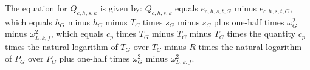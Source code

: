 The equation for \( Q_{c,h,s,k} \) is given by:
\( Q_{c,h,s,k} \) equals \( e_{c,h,s,t,G} \) minus \( e_{c,h,s,t,C} \),
which equals \( h_G \) minus \( h_C \) minus \( T_C \) times \( s_G \) minus \( s_C \) plus one-half times \( \omega_G^2 \) minus \( \omega_{L,k,f}^2 \),
which equals \( c_p \) times \( T_G \) minus \( T_C \) minus \( T_C \) times the quantity \( c_p \) times the natural logarithm of \( T_G \) over \( T_C \) minus \( R \) times the natural logarithm of \( P_G \) over \( P_C \) plus one-half times \( \omega_G^2 \) minus \( \omega_{L,k,f}^2 \).